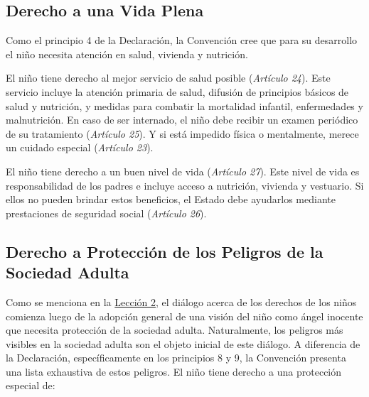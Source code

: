 \documentclass{tufte-handout}
\begin{document}
\subsection{Derecho a una Vida Plena}\label{subsec:vida_plena}


Como el principio 4 de la Declaración, la Convención cree que para su desarrollo el niño necesita atención en salud, vivienda y nutrición.

El niño tiene derecho al mejor servicio de salud posible (\textit{Artículo 24}). Este servicio incluye la atención primaria de salud, difusión de principios básicos de salud y nutrición, y medidas para combatir la mortalidad infantil, enfermedades y malnutrición. En caso de ser internado, el niño debe recibir un examen periódico de su tratamiento (\textit{Artículo 25}). Y si está impedido física o mentalmente, merece un cuidado especial (\textit{Artículo 23}).

El niño tiene derecho a un buen nivel de vida (\textit{Artículo 27}). Este nivel de vida es responsabilidad de los padres e incluye acceso a nutrición, vivienda y vestuario. Si ellos no pueden brindar estos beneficios, el Estado debe ayudarlos mediante prestaciones de seguridad social (\textit{Artículo 26}).

\subsection{Derecho a Protección de los Peligros de la Sociedad Adulta}\label{proteccion}


Como se menciona en la \hyperref[subsec:visiones]{Lección 2}, el diálogo acerca de los derechos de los niños comienza luego de la adopción general de una visión del niño como ángel inocente que necesita protección de la sociedad adulta. Naturalmente, los peligros más visibles en la sociedad adulta son el objeto inicial de este diálogo. A diferencia de la Declaración, específicamente en los principios 8 y 9, la Convención presenta una lista exhaustiva de estos peligros. El niño tiene derecho a una protección especial de:
\end{document}
